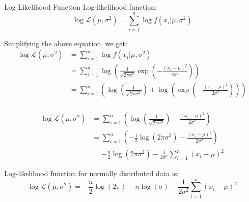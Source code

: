 \documentclass[handout]{beamer}
\begin{document}
\begin{frame}{Log Likelihood Function}
    Log-likelihood function:
    \begin{equation}
        \log \mathcal{L}(\mu, \sigma^2) = \sum_{i=1}^n \log f(x_i|\mu, \sigma^2)
    \end{equation}

    Simplifying the above equation, we get:
    \begin{align*}
        \log \mathcal{L}(\mu, \sigma^2) &= \sum_{i=1}^n \log f(x_i|\mu, \sigma^2) \\
        &= \sum_{i=1}^n \log \left( \frac{1}{\sqrt{2\pi\sigma^2}} \exp \left( -\frac{(x_i-\mu)^2}{2\sigma^2} \right) \right) \\
        &= \sum_{i=1}^n \left( \log \left( \frac{1}{\sqrt{2\pi\sigma^2}} \right) + \log \left( \exp \left( -\frac{(x_i-\mu)^2}{2\sigma^2} \right) \right) \right) \\
        \end{align*}
\end{frame}

\begin{frame}
   
    \begin{align*}
        \log \mathcal{L}(\mu, \sigma^2) &= \sum_{i=1}^n \left( \log \left( \frac{1}{\sqrt{2\pi\sigma^2}} \right) -\frac{(x_i-\mu)^2}{2\sigma^2} \right) \\
        &= \sum_{i=1}^n \left( -\frac{1}{2} \log (2\pi\sigma^2) -\frac{(x_i-\mu)^2}{2\sigma^2} \right) \\
        &= -\frac{n}{2} \log (2\pi\sigma^2) - \frac{1}{2\sigma^2} \sum_{i=1}^n (x_i-\mu)^2
        \end{align*}
        \begin{tcolorbox}[colback=metropolisblue!5,colframe=metropolisblue,title=Log Likelihood Function for Univariate Normal Distribution]
            Log-likelihood function for normally distributed data is:
            \[
                \log \mathcal{L}(\mu, \sigma^2) = -\frac{n}{2} \log(2\pi) - n\log(\sigma) - \frac{1}{2\sigma^2} \sum_{i=1}^n (x_i-\mu)^2
                \]
        \end{tcolorbox}
\end{frame}
\end{document}
